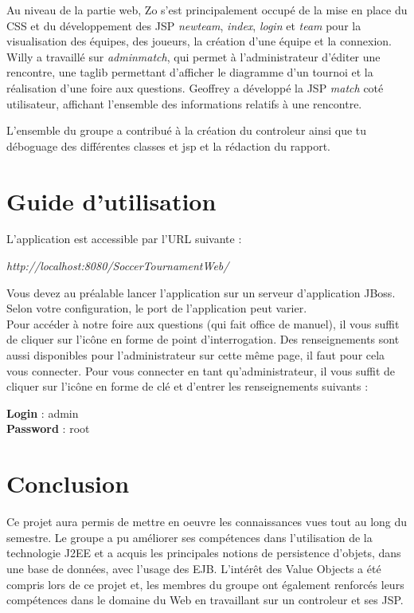 \documentclass[10pt]{report}
\begin{document}
Au niveau de la partie web, Zo s'est principalement occupé de la mise en place du CSS et du développement des JSP  \textit{newteam}, \textit{index}, \textit{login} et \textit{team} pour la visualisation des équipes, des joueurs, la création d'une équipe et la connexion.
Willy a travaillé sur \textit{adminmatch}, qui permet à l'administrateur d'éditer une rencontre, une taglib permettant d'afficher le diagramme d'un tournoi et la réalisation d'une foire aux questions.
Geoffrey a développé la JSP \textit{match} coté utilisateur, affichant l'ensemble des informations relatifs à une rencontre.

L'ensemble du groupe a contribué à la création du controleur ainsi que tu déboguage des différentes classes et jsp et la rédaction du rapport.
  
\chapter{Guide d'utilisation}


L'application est accessible par l'URL suivante :
\begin{center}
\textit{http://localhost:8080/SoccerTournamentWeb/}
\end{center}

Vous devez au préalable lancer l'application sur un serveur d'application JBoss.
Selon votre configuration, le port de l'application peut varier.
\\

Pour accéder à notre foire aux questions (qui fait office de manuel), il vous suffit de cliquer sur l'icône en forme de point d'interrogation.
Des renseignements sont aussi disponibles pour l'administrateur sur cette même page, il faut pour cela vous connecter.
Pour vous connecter en tant qu'administrateur, il vous suffit de cliquer sur l'icône en forme de clé et d'entrer les renseignements suivants :
\begin{center}
\textbf{Login} : admin
\\
\textbf{Password} : root 
\end{center}

\chapter*{Conclusion}

Ce projet aura permis de mettre en oeuvre les connaissances vues tout au long du semestre. Le groupe a pu améliorer ses compétences dans l'utilisation de la technologie J2EE et a acquis les principales notions de persistence d'objets, dans une base de données, avec l'usage des EJB. L'intérêt des Value Objects a été compris lors de ce projet et, les membres du groupe ont également renforcés leurs compétences dans le domaine du Web en travaillant sur un controleur et ses JSP. 
\end{document}
